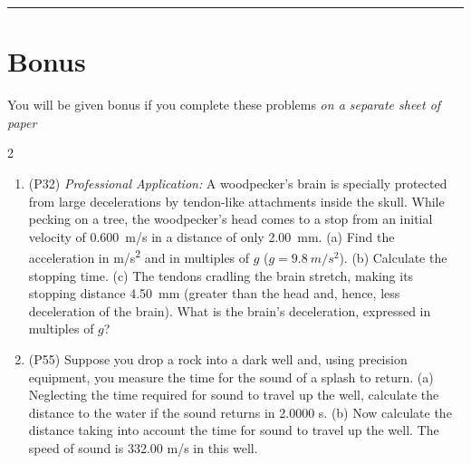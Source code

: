 \documentclass[10pt]{exam}
\def\myquestion{\item\stepcounter{endnote}}
\begin{document}
\hrule


\section*{Bonus}

You will be given bonus if you complete these problems \emph{on a separate sheet of paper}
  
\begin{multicols}{2}\begin{enumerate}[resume]


\myquestion (P32)
  \emph{Professional Application:}
  A woodpecker's brain is specially protected from large decelerations by tendon-like attachments inside the skull. While pecking on a tree, the woodpecker's head comes to a stop from an initial velocity of 0.600~m/s in a distance of only 2.00~mm. (a) Find the acceleration in \unit{m/s^2} and in multiples of $g$ ($g=\SI{9.8}{m/s^2}$). (b) Calculate the stopping time. (c) The tendons cradling the brain stretch, making its stopping distance 4.50~mm (greater than the head and, hence, less deceleration of the brain). What is the brain's deceleration, expressed in multiples of $g$?

\myquestion (P55)
  Suppose you drop a rock into a dark well and, using precision equipment, you measure the time for the sound of a splash to return. (a) Neglecting the time required for sound to travel up the well, calculate the distance to the water if the sound returns in 2.0000 s. (b) Now calculate the distance taking into account the time for sound to travel up the well. The speed of sound is 332.00 m/s in this well.




  
\end{enumerate}\end{multicols}
\end{document}
